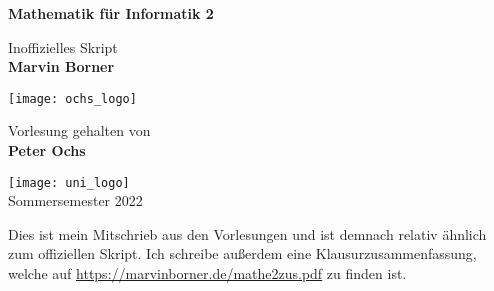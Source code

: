 \begin{titlepage}
	\begin{center}
		\vspace*{1cm}

		{\huge\textbf{Mathematik für Informatik 2}}

		\vspace{0.5cm}
		{\Large Inoffizielles Skript}\\
		\textbf{Marvin Borner}

		\vfill
		\texttt{[image: ochs\_logo]}\\
		\vfill

		Vorlesung gehalten von\\
		\textbf{Peter Ochs}

		\vspace{0.8cm}

		\texttt{[image: uni\_logo]}\\
		Sommersemester 2022
	\end{center}
\end{titlepage}

\pagebreak\hspace{0pt}\vfill\begin{center}{\Large Dies ist mein Mitschrieb aus den Vorlesungen und ist demnach relativ ähnlich zum offiziellen Skript. Ich schreibe außerdem eine Klausurzusammenfassung, welche auf \url{https://marvinborner.de/mathe2zus.pdf} zu finden ist.}\end{center}\vfill\hspace{0pt}\pagebreak
